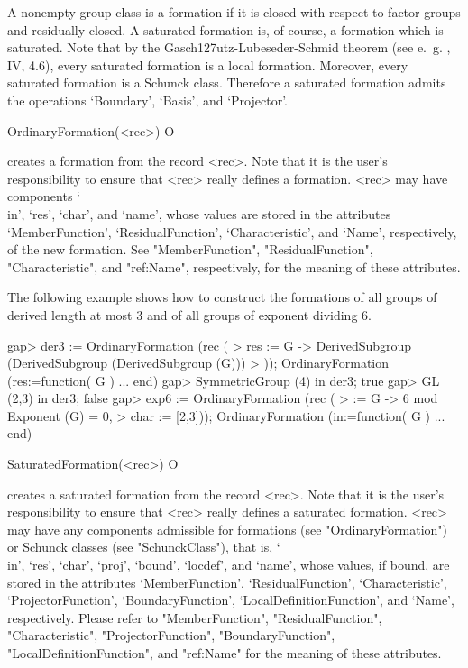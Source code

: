 \null


A nonempty group class is a  formation if it is closed with respect to factor
groups and residually closed. A saturated formation is, of course, a
formation which is saturated. Note that by the
Gasch\accent127utz-Lubeseder-Schmid theorem (see e.~g. \cite{DH92}, IV,
4.6), every saturated formation is a local formation. Moreover, every
saturated formation is a Schunck class. Therefore a saturated formation
admits the operations `Boundary', `Basis', and `Projector'.


\>OrdinaryFormation(<rec>) O

creates a formation from the record <rec>. Note that it is the user's responsibility to ensure that <rec> really
defines a formation. <rec> may have components `\\in',
`res', `char', and `name', whose values are stored in the attributes
`MemberFunction', `ResidualFunction', `Characteristic', and
`Name', respectively, of the new formation. See "MemberFunction", "ResidualFunction",
"Characteristic", and "ref:Name", respectively, for the meaning of these attributes.


The following example shows how to construct the formations of all groups of 
derived length at most $3$ and of all groups of exponent dividing $6$.

\beginexample
gap> der3 := OrdinaryFormation (rec (
>    res := G -> DerivedSubgroup (DerivedSubgroup (DerivedSubgroup (G)))
> ));
OrdinaryFormation (res:=function( G ) ... end)
gap> SymmetricGroup (4) in der3;
true
gap> GL (2,3) in der3;
false
gap> exp6 := OrdinaryFormation (rec (
>    \in := G -> 6 mod Exponent (G) = 0,
>    char := [2,3]));
OrdinaryFormation (in:=function( G ) ... end)
\endexample

\>SaturatedFormation(<rec>) O

creates a saturated formation from the record <rec>. Note that it is the user's
responsibility to ensure that <rec> really defines a saturated formation. <rec> may have
any components admissible for formations (see "OrdinaryFormation") or Schunck classes
(see "SchunckClass"), that is, `\\in', `res', `char', `proj', `bound', `locdef', and
`name',  whose values, if bound, are stored in the attributes `MemberFunction',
`ResidualFunction', `Characteristic',  `ProjectorFunction', `BoundaryFunction',
`LocalDefinitionFunction', and `Name', respectively.  Please refer to "MemberFunction", 
"ResidualFunction", "Characteristic",  "ProjectorFunction", "BoundaryFunction",
"LocalDefinitionFunction",  and "ref:Name" for the meaning of these attributes.

